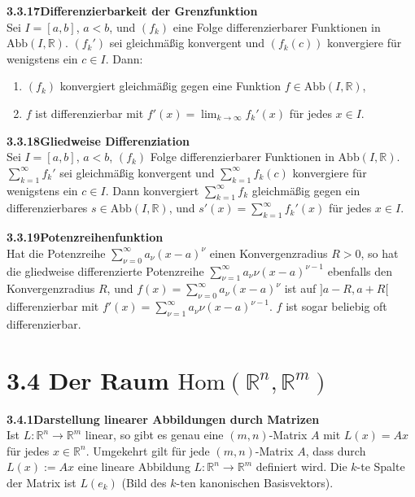 \documentclass[a4paper,12pt]{article}
\newcommand{\gentry}[3]{%
  \noindent\textbf{#1\quad #2}\nopagebreak\\[0.2em]
  #3\par\smallskip
}
\begin{document}
\gentry{3.3.17}{Differenzierbarkeit der Grenzfunktion}{%
  Sei $I = [a, b]$, $a < b$, und $(f_k)$ eine Folge differenzierbarer Funktionen in
  $\mathrm{Abb}(I, \mathbb{R})$. $(f_k')$ sei gleichm\"a{\ss}ig konvergent und $(f_k(c))$
  konvergiere f\"ur wenigstens ein $c \in I$. Dann:
  \begin{enumerate}[label=(\roman*),topsep=2pt,itemsep=1pt]
    \item $(f_k)$ konvergiert gleichm\"a{\ss}ig gegen eine Funktion $f \in \mathrm{Abb}(I, \mathbb{R})$,
    \item $f$ ist differenzierbar mit $f'(x) = \lim_{k \to \infty} f_k'(x)$ f\"ur jedes $x \in I$.
  \end{enumerate}
}

\gentry{3.3.18}{Gliedweise Differenziation}{%
  Sei $I = [a, b]$, $a < b$, $(f_k)$ Folge differenzierbarer Funktionen in
  $\mathrm{Abb}(I, \mathbb{R})$. $\sum_{k=1}^\infty f_k'$ sei gleichm\"a{\ss}ig konvergent
  und $\sum_{k=1}^\infty f_k(c)$ konvergiere f\"ur wenigstens ein $c \in I$. Dann
  konvergiert $\sum_{k=1}^\infty f_k$ gleichm\"a{\ss}ig gegen ein differenzierbares
  $s \in \mathrm{Abb}(I, \mathbb{R})$, und
  $s'(x) = \sum_{k=1}^\infty f_k'(x)$ f\"ur jedes $x \in I$.
}

\gentry{3.3.19}{Potenzreihenfunktion}{%
  Hat die Potenzreihe $\sum_{\nu=0}^\infty a_\nu (x - a)^\nu$ einen Konvergenzradius
  $R > 0$, so hat die gliedweise differenzierte Potenzreihe
  $\sum_{\nu=1}^\infty a_\nu \nu (x - a)^{\nu-1}$ ebenfalls den Konvergenzradius $R$,
  und $f(x) = \sum_{\nu=0}^\infty a_\nu (x - a)^\nu$ ist auf $]a - R, a + R[$
  differenzierbar mit $f'(x) = \sum_{\nu=1}^\infty a_\nu \nu (x - a)^{\nu-1}$.
  $f$ ist sogar beliebig oft differenzierbar.
}

\section*{3.4 \quad Der Raum $\mathrm{Hom}(\mathbb{R}^n, \mathbb{R}^m)$}

\gentry{3.4.1}{Darstellung linearer Abbildungen durch Matrizen}{%
  Ist $L : \mathbb{R}^n \to \mathbb{R}^m$ linear, so gibt es genau eine $(m, n)$-Matrix
  $A$ mit $L(x) = Ax$ f\"ur jedes $x \in \mathbb{R}^n$. Umgekehrt gilt f\"ur jede
  $(m, n)$-Matrix $A$, dass durch $L(x) := Ax$ eine lineare Abbildung
  $L : \mathbb{R}^n \to \mathbb{R}^m$ definiert wird.
  Die $k$-te Spalte der Matrix ist $L(e_k)$ (Bild des $k$-ten kanonischen Basisvektors).
}
\end{document}
